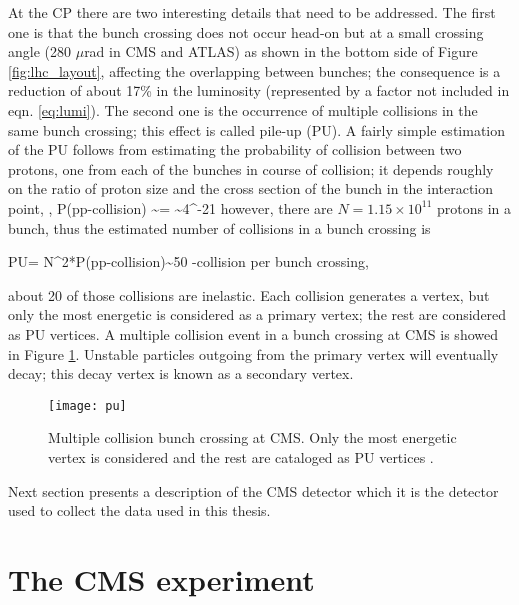 \noindent At the CP there are two interesting details that need to be addressed. The first one is that the bunch crossing does not occur head-on but at a small crossing angle  (280 $\mu$rad in CMS and ATLAS) as shown in the bottom side of Figure \ref{fig:lhc_layout}, affecting the overlapping between bunches; the consequence is a reduction of about 17\% in the luminosity (represented by a factor not included in eqn. \ref{eq:lumi}). The second one is the occurrence of multiple \pp collisions in the same bunch crossing; this effect is called pile-up (PU). A fairly simple estimation of the PU follows from estimating the probability of collision between two protons, one from each of the bunches in course of collision; it depends roughly on the ratio of proton size and the cross section of the bunch in the interaction point, \ie,
\beqn
P(pp-collision) \sim {}= \sim 4^{-21}
\eeqn
\noindent however, there are $N=1.15\times 10^{11}$ protons in a bunch, thus the estimated number of collisions in a bunch crossing is

\beqn
PU= N^2*P(pp-collision)\sim 50  \textrm{  \pp-collision per bunch crossing},
\eeqn

\noindent about 20 of those \pp collisions are inelastic. Each collision generates a vertex, but only the most energetic is considered as a primary vertex; the rest are considered as PU vertices.  A multiple \pp collision event in a bunch crossing at CMS is showed in Figure \ref{fig:pu}. Unstable particles outgoing from the primary vertex will eventually decay; this decay vertex is known as a secondary vertex.\\      

\begin{figure}[!h]
\centering
\texttt{[image: pu]}
\caption [Multiple \pp collision bunch crossing at CMS.]{Multiple \pp collision bunch crossing at CMS. Only the most energetic vertex is considered and the rest are cataloged as PU vertices \cite{pu}. }\label{fig:pu}
\end{figure}

\noindent Next section presents a description of the CMS detector which it is the detector used to collect the data used in this thesis.

\section{The CMS experiment}

